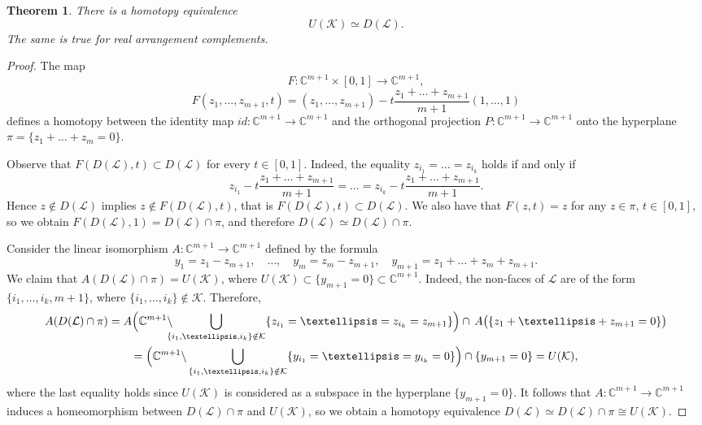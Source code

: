 \documentclass[a4paper,12pt]{amsart}
\newcommand{\K}{\mathcal K}
\newcommand{\CC}{\mathbb C}
\newtheorem{theorem}[formula]{Theorem}
\theoremstyle{definition}
\theoremstyle{remark}
\numberwithin{equation}{section}
\begin{document}
\begin{theorem}\label{res1}
There is a homotopy equivalence
	$$U(\K) \simeq D(\mathcal{L}).$$
The same is true for real arrangement complements.
\end{theorem}
\begin{proof}
	The map
	$$F: \CC^{m+1}\times [0,1] \to \CC^{m+1},$$
	$$F(z_1, \dots, z_{m+1}, t) = (z_1, \dots, z_{m+1}) - t
	\frac{z_1 + \dots + z_{m+1}}{m+1} (1, \dots, 1)$$
	defines a homotopy between the identity map $id: \CC^{m+1} \to \CC^{m+1}$ and the orthogonal projection
	$P: \CC^{m+1} \to \CC^{m+1}$ onto the hyperplane $\pi = \{z_1 + \dots + z_m = 0\}$.
	
Observe that $F(D(\mathcal{L}), t) \subset D(\mathcal{L})$ for every $t \in [0, 1]$. 
	Indeed, the equality $z_{i_1} = \dots = z_{i_k}$ holds if and only if
	$$z_{i_1} - t \frac{z_1 + \dots + z_{m+1}}{m+1} = \dots = z_{i_k} - t \frac{z_1 + \dots + z_{m+1}}{m+1}.$$
	Hence $z \notin D(\mathcal{L})$ implies $z \notin F(D(\mathcal{L}), t)$, that is $F(D(\mathcal{L}), t) \subset D(\mathcal{L})$.
	We also have that $F(z, t) = z$ for any $z \in \pi$, $t \in [0, 1]$,
	so we obtain $F(D(\mathcal{L}), 1) = D(\mathcal{L}) \cap \pi$,
	and therefore $D(\mathcal{L}) \simeq D(\mathcal{L}) \cap \pi$.
	
	Consider the linear isomorphism $A: \CC^{m+1} \to \CC^{m+1}$ defined by the formula
	$$y_1 = z_1 - z_{m+1},\quad \dots, \quad y_m = z_m - z_{m+1}, \quad y_{m+1} = z_1 + \dots + z_m + z_{m+1}.$$
	We claim that $A(D(\mathcal{L}) \cap \pi) = U(\K)$, where $U(\K) \subset \{y_{m+1} = 0\} \subset \CC^{m+1}$. 
	Indeed, %
    the non-faces of $\mathcal{L}$ are of the form $\{i_1, \dots, i_k, m+1\}$,
	where $\{i_1, \dots, i_k\} \notin \K$. Therefore,
\begin{multline*}
  A(D(\mathcal{L}) \cap \pi) = A\Bigl( { \CC^{m+1} \backslash\!\!\!\!\bigcup_{\{i_1, \dots, i_k\} \notin \K}
		\{z_{i_1} = \dots = z_{i_k} = z_{m+1} \} }\Bigr)  \cap \,A \bigl({ \{z_1 + \dots + z_{m+1} = 0\} }\bigr) \\
		= \Bigl({\CC^{m+1} \backslash \bigcup_{\{i_1, \dots, i_k\} \notin \K}
		\{y_{i_1} = \dots = y_{i_k} = 0 \} }\Bigr) \cap \{y_{m+1} = 0 \} = U(\K),
\end{multline*}  
where the last equality holds since $U(\K)$ is considered as a subspace in the hyperplane $\{y_{m+1} = 0\}$.
It follows that $A\colon \CC^{m+1} \to \CC^{m+1}$ induces a homeomorphism between $D(\mathcal{L}) \cap \pi$ and $U(\K)$, so we obtain a homotopy equivalence $D(\mathcal{L}) \simeq D(\mathcal{L})\cap \pi \cong U(\K)$.
\end{proof}
\end{document}
